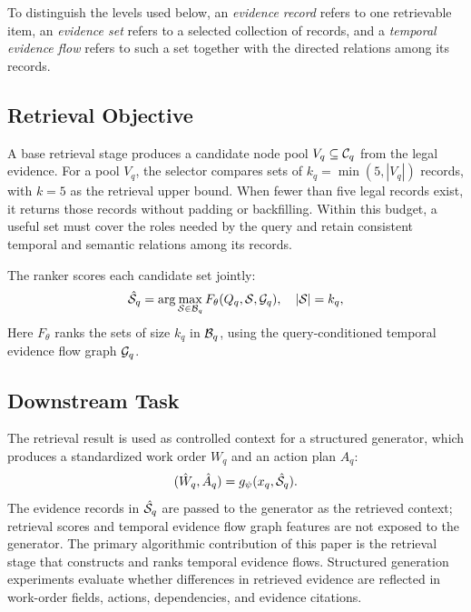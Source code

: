To distinguish the levels used below, an \emph{evidence record} refers to one retrievable item, an \emph{evidence set} refers to a selected collection of records, and a \emph{temporal evidence flow} refers to such a set together with the directed relations among its records.

\subsection{Retrieval Objective}

A base retrieval stage produces a candidate node pool \(V_q\subseteq\mathcal{C}_q\) from the legal evidence. For a pool $V_q$, the selector compares sets of $k_q=\min(5,|V_q|)$ records, with $k=5$ as the retrieval upper bound. When fewer than five legal records exist, it returns those records without padding or backfilling. Within this budget, a useful set must cover the roles needed by the query and retain consistent temporal and semantic relations among its records.

The ranker scores each candidate set jointly:
\begin{equation}
\hat{\mathcal{S}}_q
=
\arg\max_{\mathcal{S}\in\mathcal{B}_q}
F_{\theta}(Q_q,\mathcal{S},\mathcal{G}_q),
\quad |\mathcal{S}|=k_q,
\label{eq:set_selection}
\end{equation}
Here $F_{\theta}$ ranks the sets of size $k_q$ in $\mathcal{B}_q$, using the query-conditioned temporal evidence flow graph $\mathcal{G}_q$.

\subsection{Downstream Task}

The retrieval result is used as controlled context for a structured generator, which produces a standardized work order $W_q$ and an action plan $A_q$:
\begin{equation}
(\hat W_q,\hat A_q)=g_{\psi}(x_q,\hat{\mathcal{S}}_q).
\label{eq:downstream_generation}
\end{equation}
The evidence records in $\hat{\mathcal{S}}_q$ are passed to the generator as the retrieved context; retrieval scores and temporal evidence flow graph features are not exposed to the generator. The primary algorithmic contribution of this paper is the retrieval stage that constructs and ranks temporal evidence flows. Structured generation experiments evaluate whether differences in retrieved evidence are reflected in work-order fields, actions, dependencies, and evidence citations.

